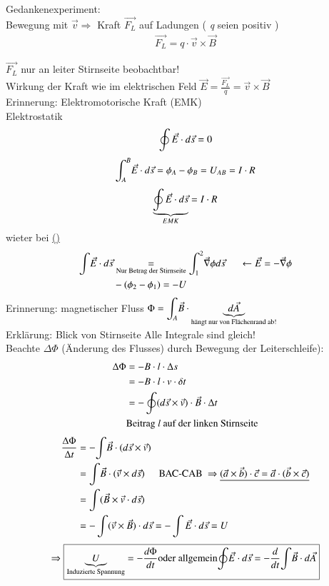 Gedankenexperiment: \\
	
	\bild 
	Bewegung mit $ \vec{v} \Rightarrow $ Kraft $ \vec{F_L} $ auf Ladungen ( \emph{q} seien positiv )
	\begin{align*}
	\vec{F_L} = q \cdot \vec{v} \times \vec{B}
	\end{align*}
	
	$ \vec{F_L} $ nur an leiter Stirnseite beobachtbar! \\
	\hypertarget{target1}{}
	Wirkung der Kraft wie im elektrischen Feld $  \vec{E} = \frac{\vec{F_L}}{q} = \vec{v} \times \vec{B} $ \\
	Erinnerung: Elektromotorische Kraft (EMK)\\
	Elektrostatik
	\bild
	$$ {\displaystyle \oint\vec{E}\cdot d\vec{s}=0} $$
	\bild
	$$ {\displaystyle \int_{A}^{B}} \vec{E} \cdot d\vec{s} = \phi_A - \phi_B = U_{AB} = I \cdot R $$
	\bild
	$$ {\displaystyle \underbrace{\oint \vec{E} \cdot d\vec{s}}_{EMK} = I \cdot R }$$
	wieter bei \hyperlink{target1}{(\textasteriskcentered)} 
	\begin{align*}
	{\displaystyle \int} \vec{E} \cdot d\vec{s} &\underset{\text{Nur Betrag der Stirnseite} }{=} {\displaystyle \int_{1}^{2}} \vec{\nabla} \phi d \vec{s} \hspace{5mm} \leftarrow \vec{E} = -\vec{\nabla}\phi \\
	& - (\phi_2-\phi_1) = - U\\ 
	\end{align*} 
	Erinnerung: magnetischer Fluss $ \Phi = {\displaystyle \int_A} \vec{B} \cdot \underbrace{d\vec{A}}_{\text{hängt nur von Flächenrand ab!}}$ \\
	
	Erklärung: Blick von Stirnseite
	\bild
	Alle Integrale sind gleich!\\
	\break
	Beachte $ \Delta\Phi $ (Änderung des Flusses) durch Bewegung der Leiterschleife):
	\begin{align*}
	\Delta\Phi &= -B \cdot l \cdot \Delta s\\
	&= - B \cdot l \cdot v \cdot \delta t \\
	&= - \oint(d\vec{s} \times \vec{v}) \cdot \vec{B} \cdot \Delta t\\
	& \text{Beitrag \emph{l} auf der linken Stirnseite}
	\end{align*}
	\begin{align*}
	\frac{\Delta\Phi}{\Delta t} &= - {\int} \vec{B} \cdot (d\vec{s} \times \vec{v})\\
	&= {\int} \vec{B} \cdot (\vec{v} \times d\vec{s}) \hspace{5mm} \text{BAC-CAB } \Rightarrow \underline{(\vec{a} \times \vec{b}) \cdot \vec{c} = \vec{a} \cdot (\vec{b}\times\vec{c})}\\
	&= {\int} (\vec{B} \times \vec{v} \cdot d\vec{s})\\
	&= - \int (\vec{v} \times \vec{B}) \cdot d\vec{s} = - \int\vec{E} \cdot d\vec{s} = U
	\end{align*}
	$$ \Rightarrow \boxed{\underbrace{U}_{\text{Induzierte Spannung}} =  - \frac{d\Phi}{dt} \text{oder allgemein} {\displaystyle \oint} \vec{E} \cdot d\vec{s} = -\frac{d}{dt} {\displaystyle \int} \vec{B} \cdot d\vec{A}} $$
